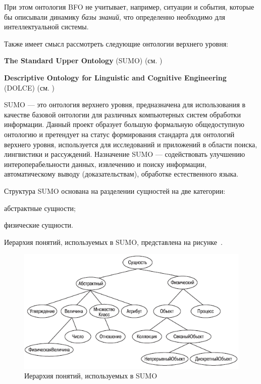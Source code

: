 При этом онтология BFO не учитывает, например, ситуации и события, которые бы описывали динамику \textit{базы знаний}, что определенно необходимо для интеллектуальной системы.

Также имеет смысл рассмотреть следующие онтологии верхнего уровня:
\begin{textitemize}
	\item{\textbf{The Standard Upper Ontology} (SUMO) (см. )}
	\item{\textbf{Descriptive Ontology for Linguistic and Cognitive Engineering} (DOLCE) (см. )}
\end{textitemize}

SUMO --- это онтология верхнего уровня, предназначена для использования в качестве базовой онтологии для различных компьютерных систем обработки информации. Данный проект образует большую формальную общедоступную онтологию и претендует на статус формирования стандарта для онтологий верхнего уровня, используется для исследований и приложений в области поиска, лингвистики и рассуждений. Назначение SUMO --- содействовать улучшению интероперабельности данных, извлечению и поиску информации, автоматическому выводу (доказательствам), обработке естественного языка.

Структура SUMO основана на разделении сущностей на две категории:
\begin{textitemize}
	\item абстрактные сущности;
	\item физические сущности.
\end{textitemize}

Иерархия понятий, используемых в SUMO, представлена на рисунке~\textit{}.

\begin{figure}[H]
	\includegraphics[scale=0.8]{author/part2/figures/chapter_kb/sumo.png}
	\caption{Иерархия понятий, используемых в SUMO}
	\label{fig:sumo}
\end{figure}

